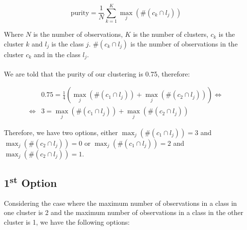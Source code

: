 \documentclass{article}
\begin{document}
\[ \text{purity} = \frac{1}{N} \sum_{k=1}^K \max_j (\#(c_k \cap l_j)) \]

Where $N$ is the number of observations, $K$ is the number of clusters, $c_k$ is the cluster $k$ and $l_j$ is the class $j$.
$\#(c_k \cap l_j)$ is the number of observations in the cluster $c_k$ and in the class $l_j$.
\paragraph{}

We are told that the purity of our clustering is 0.75, therefore:

\begin{align*}
  &0.75 = \frac{1}{4} ( \max_j (\#(c_1 \cap l_j)) + \max_j (\#(c_2 \cap l_j)) ) \Leftrightarrow \\
  \Leftrightarrow &3 = \max_j (\#(c_1 \cap l_j)) + \max_j (\#(c_2 \cap l_j))
\end{align*}

Therefore, we have two options, either $\max_j (\#(c_1 \cap l_j)) = 3$ and $\max_j (\#(c_2 \cap l_j)) = 0$ or $\max_j (\#(c_1 \cap l_j)) = 2$ and $\max_j (\#(c_2 \cap l_j)) = 1$.

\subsection*{1\textsuperscript{st} Option}

Considering the case where the maximum number of observations in a class in one cluster is 2 and the maximum number of observations in a class in the other cluster is 1, we have the following options:


\begin{center}
\end{center}
\end{document}
